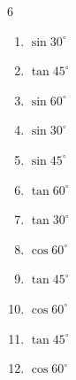 \begin{multicols}{6}
\begin{enumerate}

  \item $\displaystyle \sin{30^\circ}$


  \item $\displaystyle \tan{45^\circ}$

        \phantom{$\displaystyle =1$}

  \item $\displaystyle \sin{60^\circ}$


  \item $\displaystyle \sin{30^\circ}$


\columnbreak %

  \item $\displaystyle \sin{45^\circ}$


  \item $\displaystyle \tan{60^\circ}$


  \item $\displaystyle \tan{30^\circ}$


  \item $\displaystyle \cos{60^\circ}$


  \item $\displaystyle \tan{45^\circ}$

        \phantom{$\displaystyle =1$}

  \item $\displaystyle \cos{60^\circ}$


  \item $\displaystyle \tan{45^\circ}$

        \phantom{$\displaystyle =1$}

  \item $\displaystyle \cos{60^\circ}$



\end{enumerate}
\end{multicols}
